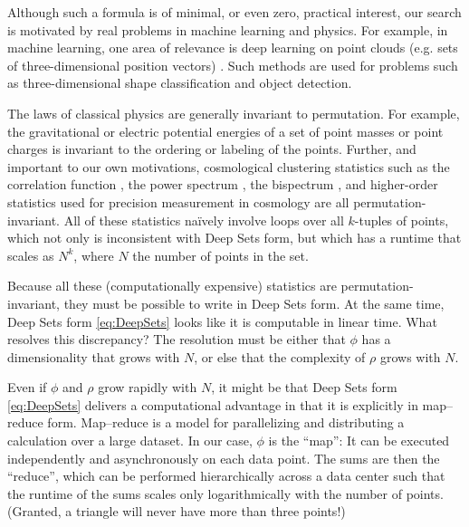 \documentclass[12pt]{article}
\newcommand{\CH}[1]{{\color{blue} (CH says: #1)}}
\newcommand{\pseudosection}[1]
{}
\begin{document}
\pseudosection{Computational motivations}


Although such a formula is of minimal, or even zero, practical interest, our search is motivated by real problems in machine learning and physics.
For example, in machine learning, one area of relevance is deep learning on point clouds (e.g. sets of three-dimensional position vectors) \citep{guo2020pointclouds}.
Such methods are used for problems such as three-dimensional shape classification and object detection.

\pseudosection{Cosmology motivations}

The laws of classical physics are generally invariant to permutation.
For example, the gravitational or electric potential energies of a set of point masses or point charges is invariant to the ordering or labeling of the points.
Further, and important to our own motivations, cosmological clustering statistics such as 
the correlation function \citep{},
the power spectrum \citep{},
the bispectrum \citep{},
and higher-order statistics \citep{}
used for precision measurement in cosmology \citep{}
are all permutation-invariant.
All of these statistics na\"ively involve loops over all $k$-tuples of points, which not only is inconsistent with Deep Sets form, but which has a runtime that scales as $N^k$, where $N$ the number of points in the set.

\pseudosection{Scalings}

Because all these (computationally expensive) statistics are permutation-invariant, they must be possible to write in Deep Sets form.
At the same time, Deep Sets form \eqref{eq:DeepSets} looks like it is computable in linear time. 
What resolves this discrepancy?
The resolution must be either that $\phi$ has a dimensionality that grows with $N$, or else that the complexity of $\rho$ grows with $N$.

Even if $\phi$ and $\rho$ grow rapidly with $N$, it might be that Deep Sets form \eqref{eq:DeepSets} delivers a computational advantage in that it is explicitly in map--reduce form.
Map--reduce is a model for parallelizing and distributing a calculation over a large dataset.
In our case, $\phi$ is the ``map'':
It can be executed independently and asynchronously on each data point.
The sums are then the ``reduce'', which can be performed hierarchically across a data center such that the runtime of the sums scales only logarithmically with the number of points.
(Granted, a triangle will never have more than three points!)
\end{document}
